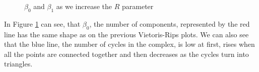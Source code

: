 \documentclass[a4paper, 12pt]{article}
\begin{document}
\begin{figure}[H]
        \centering
        \caption{$\beta_0$ and $\beta_1$ as we increase the $R$ parameter}
        \label{plot-cech}
\end{figure}
In Figure \ref{plot-cech} can see, that $\beta_0$, the number of components, represented by the red line has the same shape as on the previous Vietoris-Rips plots. We can also see that the blue line, the number of cycles in the complex, is low at first, rises when all the points are connected together and then decreases as the cycles turn into triangles. 
\end{document}
